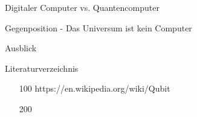 \documentclass[aspectratio=1610, 9pt]{beamer}
\begin{document}
\begin{frame}{Digitaler Computer vs. Quantencomputer}

\end{frame}

\begin{frame}{Gegenposition - Das Universum ist kein Computer}

\end{frame}

\begin{frame}{Ausblick}

\end{frame}

\begin{frame}{Literaturverzeichnis}
  \begin{itemize}
    \item[100] https://en.wikipedia.org/wiki/Qubit
    \item[200]
  \end{itemize}

\end{frame}
\end{document}
